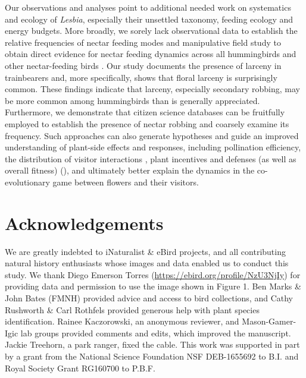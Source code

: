 \documentclass[fleqn,10pt,lineno]{wlpeerj}
\begin{document}
Our observations and analyses point to additional needed work on systematics and ecology of \textit{Lesbia}, especially their unsettled taxonomy, feeding ecology and energy budgets.  %
More broadly, we sorely lack observational data to establish the relative frequencies of nectar feeding modes and manipulative field study to obtain direct evidence for nectar feeding dynamics across all hummingbirds and other nectar-feeding birds \citep{irwin2010}.
Our study documents the presence of larceny in trainbearers and, more specifically, shows that floral larceny is surprisingly common. 
These findings indicate that larceny, especially secondary robbing, may be more common among hummingbirds than is generally appreciated.
Furthermore, we demonstrate that citizen science databases can be fruitfully employed to establish the presence of nectar robbing and coarsely examine its frequency.
Such approaches can also generate hypotheses and guide an improved understanding of plant-side effects and responses, including pollination efficiency, the distribution of visitor interactions \citep{maloof2000,arizmendi2001}, plant incentives and defenses (as well as overall fitness) (\citealt{pelayo2011}), and ultimately better explain the dynamics in the co-evolutionary game between flowers and their visitors.

\section*{Acknowledgements}

We are greatly indebted to iNaturalist \& eBird projects, and all contributing natural history enthusiasts whose images and data enabled us to conduct this study. 
We thank Diego Emerson Torres (\href{https://ebird.org/profile/NzU3NjIy}{https://ebird.org/profile/NzU3NjIy}) for providing data and permission to use the image shown in Figure 1. 
Ben Marks \& John Bates (FMNH) provided advice and access to bird collections, and Cathy Rushworth \& Carl Rothfels provided generous help with plant species identification. 
Rainee Kaczorowski, an anonymous reviewer, and Mason-Gamer-Igic lab groups provided comments and edits, which improved the manuscript.
Jackie Treehorn, a park ranger, fixed the cable.
This work was supported in part by a grant from the National Science Foundation NSF DEB-1655692 to B.I. and Royal Society Grant RG160700 to P.B.F.
\end{document}
